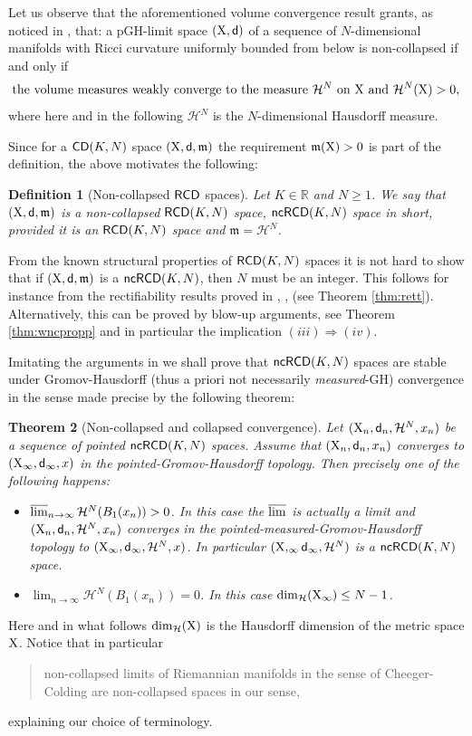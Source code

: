 \documentclass[reqno,11pt]{article}
\numberwithin{equation}{section}
\newcommand{\R}{\mathbb{R}}
\newcommand{\mm}{{\mbox{\boldmath$m$}}}
\newcommand{\sfd}{{\sf d}}
\newcommand{\lims}{\varlimsup}
\renewcommand{\mm}{\mathfrak m}                                %
\newtheorem{theorem}{Theorem}[section]
\newtheorem{definition}[theorem]{Definition}
\newcommand{\X}{{\rm X}}
\newcommand{\CD}{{\sf CD}}
\newcommand{\RCD}{{\sf RCD}}
\newcommand{\ncRCD}{{\sf ncRCD}}
\newcommand{\HH}{{\mathcal H}}
\begin{document}
Let us observe that the aforementioned volume convergence result grants, as noticed in \cite{Cheeger-Colding97I}, that: a pGH-limit space $(\X,\sfd)$ of a sequence of $N$-dimensional manifolds with Ricci curvature uniformly bounded from below is non-collapsed if and only if
\[
\text{the volume measures weakly converge to the measure $\HH^N$ on $\X$ and $\HH^N(\X)>0$},
\]
where here and in the following $\HH^N$ is the  $N$-dimensional Hausdorff measure.

Since for a $\CD(K,N)$ space $(\X,\sfd,\mm)$ the requirement $\mm(\X)>0$ is part of the definition, the above motivates  the following:
\begin{definition}[Non-collapsed $\RCD$ spaces] Let $K\in\R$ and $N\geq 1$. We say that $(\X,\sfd,\mm)$ is a \emph{non-collapsed} $\RCD(K,N)$ space, $\ncRCD(K,N)$ space in short, provided it is an $\RCD(K,N)$ space and $\mm=\HH^N$.
\end{definition}
From the known structural properties of $\RCD(K,N)$ spaces it is not hard to show that if $(\X,\sfd,\mm)$ is  a  $\ncRCD(K,N)$, then   $N$  must be  an  integer. This follows for instance from the rectifiability results proved in \cite{Mondino-Naber14}, \cite{MK16}, \cite{GP16-2} (see Theorem \ref{thm:rett}). Alternatively, this can be proved by blow-up arguments, see Theorem \ref{thm:wncpropp} and in particular the implication $(iii)\Rightarrow (iv)$.

Imitating the arguments in \cite{Cheeger-Colding97I} we shall prove that $\ncRCD(K,N)$ spaces are stable   under Gromov-Hausdorff (thus a priori not necessarily \emph{measured}-GH) convergence in the sense made precise by the following theorem:
\begin{theorem}[Non-collapsed and collapsed convergence]\label{thm:stabnc}
Let $(\X_n,\sfd_n,\HH^N,x_n)$ be a sequence of pointed $\ncRCD(K,N)$ spaces. Assume that $(\X_n,\sfd_n,x_n)$ converges to $(\X_\infty,\sfd_\infty,x)$ in the pointed-Gromov-Hausdorff topology. Then precisely one of the following happens:
\begin{itemize}
\item[i)] $\lims_{n\to\infty}\HH^N(B_1(x_n))>0$. In this case the $\lims$ is actually a limit and $(\X_n,\sfd_n,\HH^N,x_n)$ converges in the pointed-measured-Gromov-Hausdorff topology to $(\X_\infty,\sfd_\infty,\HH^N,x)$. In particular $(\X,_\infty\sfd_\infty,\HH^N)$ is a $\ncRCD(K,N)$ space.
\item[ii)] $\lim_{n\to\infty}\HH^N(B_1(x_n))=0$. In this case $\dim_{\HH}(\X_\infty)\leq N-1$.
\end{itemize}
\end{theorem}
Here and in what follows $\dim_\HH(\X)$ is the Hausdorff dimension of the metric space $\X$.  Notice that in particular
\begin{quote} 
non-collapsed limits of Riemannian manifolds in the sense of Cheeger-Colding are non-collapsed spaces in our sense, 
\end{quote} 
explaining our choice of terminology.
\end{document}
